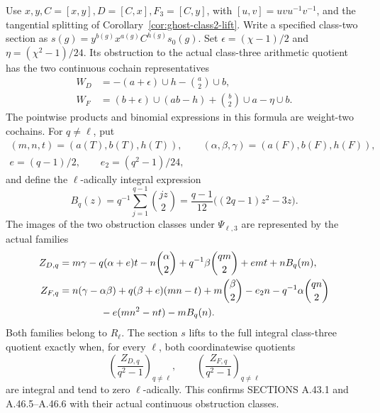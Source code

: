 \begin{proposition}
\label{prop:ghost-class3-residue}
Use \(x,y,C=[x,y],D=[C,x],F_3=[C,y]\), with
\([u,v]=uvu^{-1}v^{-1}\), and the tangential splitting of
Corollary~\ref{cor:ghost-class2-lift}. Write a specified
class-two section as
\(s(g)=y^{b(g)}x^{a(g)}C^{h(g)}s_0(g)\).
Set \(\epsilon=(\chi-1)/2\) and
\(\eta=(\chi^2-1)/24\). Its obstruction to the actual
class-three arithmetic quotient has the two continuous
cochain representatives
\[
 \begin{split}
 W_D&=-(a+\epsilon)\cup h-\binom a2\cup b,\\
 W_F&=(b+\epsilon)\cup(ab-h)+\binom b2\cup a-\eta\cup b.
 \end{split}
\]
The pointwise products and binomial expressions in this
formula are weight-two cochains. For \(q\ne\ell\), put
\[
 \begin{gathered}
 (m,n,t)=(a(T),b(T),h(T)),\qquad
 (\alpha,\beta,\gamma)=(a(F),b(F),h(F)),\\
 e=(q-1)/2,\qquad e_2=(q^2-1)/24,
 \end{gathered}
\]
and define the \(\ell\)-adically integral expression
\[
 B_q(z)=q^{-1}\sum_{j=1}^{q-1}\binom{jz}{2}
       =\frac{q-1}{12}\bigl((2q-1)z^2-3z\bigr).
\]
The images of the two obstruction classes under
\(\Psi_{\ell,3}\) are represented by the actual families
\[
 \begin{split}
 Z_{D,q}={}&m\gamma-q(\alpha+e)t-n\binom\alpha2
       +q^{-1}\beta\binom{qm}{2}+emt+nB_q(m),\\
 Z_{F,q}={}&n(\gamma-\alpha\beta)+q(\beta+e)(mn-t)
       +m\binom\beta2-e_2n-q^{-1}\alpha\binom{qn}{2}\\
       &\hspace{10mm}-e(mn^2-nt)-mB_q(n).
 \end{split}
\]
Both families belong to \(R_\ell\). The section \(s\)
lifts to the full integral class-three quotient exactly
when, for every \(\ell\), both coordinatewise quotients
\[
       \left(\frac{Z_{D,q}}{q^2-1}\right)_{q\ne\ell},
       \qquad
       \left(\frac{Z_{F,q}}{q^2-1}\right)_{q\ne\ell}
\]
are integral and tend to zero \(\ell\)-adically.
This confirms SECTIONS A.43.1 and A.46.5--A.46.6 with
their actual continuous obstruction classes.
\end{proposition}

